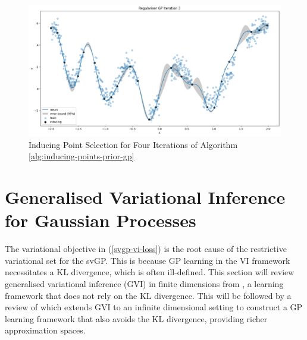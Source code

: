 \documentclass{article}
\numberwithin{equation}{section}
\begin{document}
\begin{figure}[h!]
\begin{minipage}{.5\textwidth}
  \includegraphics[width=\linewidth]{thesis-report/figures/inducing_points_kernel/iteration-3/prediction.png}
\end{minipage}%
\caption{Inducing Point Selection for Four Iterations of Algorithm \ref{alg:inducing-points-prior-gp}}
\label{inducing-points-and-kernel}
\end{figure}

\newpage
\section{Generalised Variational Inference for Gaussian Processes}\label{section:gvi-for-gps}
The variational objective in (\ref{svgp-vi-loss}) is the root cause of the restrictive variational set for the svGP. This is because GP learning in the VI framework necessitates a KL divergence, which is often ill-defined.
This section will review generalised variational inference (GVI) in finite dimensions from \cite{knoblauch2022optimization}, a learning framework that does not rely on the KL divergence.
This will be followed by a review of \cite{wild2022generalized} which extends GVI to an infinite dimensional setting to construct a GP learning framework that also avoids the KL divergence, providing richer approximation spaces.
\end{document}
